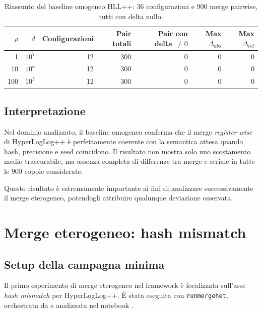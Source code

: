 \begin{table}[htbp]
    \centering
    \small
    \setlength{\tabcolsep}{6pt}
    \renewcommand{\arraystretch}{1.12}
    \begin{tabular}{|r|r|r|r|r|r|r|}
        \hline
        \(\rho\) & \(d\) & Configurazioni & Pair totali & Pair con delta \(\neq 0\) & Max \(\Delta_{abs}\) & Max \(\Delta_{rel}\) \\
        \hline
        1 & \(10^7\) & 12 & 300 & 0 & 0 & 0 \\
        \hline
        10 & \(10^6\) & 12 & 300 & 0 & 0 & 0 \\
        \hline
        100 & \(10^5\) & 12 & 300 & 0 & 0 & 0 \\
        \hline
    \end{tabular}
    \caption{Riassunto del baseline omogeneo HLL++: 36 configurazioni e 900 merge pairwise, tutti con delta nullo.}
    \label{tab:hllpp-homogeneous-merge-summary}
\end{table}

\subsection{Interpretazione}

Nel dominio analizzato, il baseline omogeneo conferma che il merge
\emph{register-wise} di HyperLogLog++ è perfettamente coerente con la semantica
attesa quando hash, precisione e seed coincidono. Il risultato non mostra solo
uno scostamento medio trascurabile, ma assenza completa di differenze tra merge
e seriale in tutte le 900 coppie considerate.

Questo risultato \`e estremamente importante ai fini di analizzare successivamente il merge
eterogeneo, potendogli attribuire qualunque deviazione osservata.

\section{Merge eterogeneo: hash mismatch}

\subsection{Setup della campagna minima}

Il primo esperimento di merge eterogeneo nel
framework è focalizzata sull'asse \emph{hash mismatch} per HyperLogLog++.
\`E stata eseguita con \texttt{runmergehet}, orchestrata da
 e analizzata nel notebook
.

